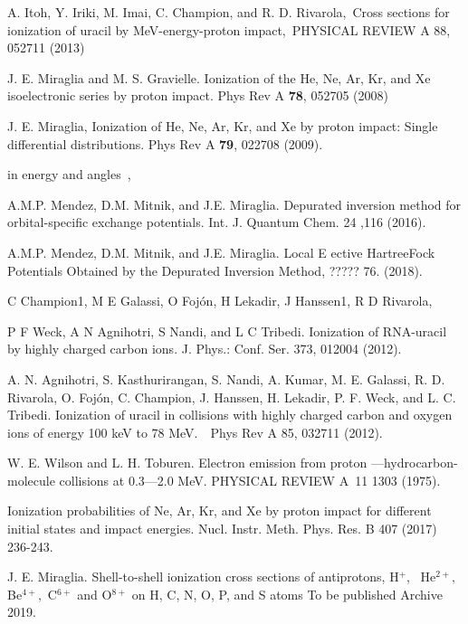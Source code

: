 \documentclass[preprint,showpacs,pra]{revtex4}
\begin{document}
\begin{thebibliography}{99}
 A. Itoh, Y. Iriki, M. Imai, C. Champion, and R. D.
Rivarola,~Cross sections for ionization of uracil by MeV-energy-proton
impact,\ PHYSICAL REVIEW A 88, 052711 (2013)

 J. E. Miraglia and M. S. Gravielle. Ionization of the
He, Ne, Ar, Kr, and Xe isoelectronic series by proton impact. Phys Rev A 
\textbf{78}, 052705 (2008)

 J. E. Miraglia, Ionization of He, Ne, Ar, Kr, and Xe
by proton impact: Single differential distributions. Phys Rev A \textbf{79},
022708 (2009).

\bibitem{} in energy and angles~,

 A.M.P. Mendez, D.M. Mitnik, and J.E. Miraglia.
Depurated inversion method for orbital-specific exchange potentials. Int. J.
Quantum Chem. 24 ,116 (2016).

 A.M.P. Mendez, D.M. Mitnik, and J.E. Miraglia. Local E
ective HartreeFock Potentials Obtained by the Depurated Inversion Method,
????? 76. (2018).

 C Champion1, M E Galassi, O Foj\'{o}n, H Lekadir, J
Hanssen1, R D Rivarola,

P F Weck, A N Agnihotri, S Nandi, and L C Tribedi. Ionization of RNA-uracil
by highly charged carbon ions. J. Phys.: Conf. Ser. 373, 012004 (2012).

 A. N. Agnihotri, S. Kasthurirangan, S. Nandi, A.
Kumar, M. E. Galassi, R. D. Rivarola, O. Foj\'{o}n, C. Champion, J. Hanssen,
H. Lekadir, P. F. Weck, and L. C. Tribedi. Ionization of uracil in
collisions with highly charged carbon and oxygen ions of energy 100 keV to
78 MeV.\ \ Phys Rev A 85, 032711 (2012).

 W. E. Wilson and L. H. Toburen. Electron emission from
proton ---hydrocarbon-molecule collisions at 0.3---2.0 MeV. PHYSICAL REVIEW
A\ 11 1303 (1975).

 Ionization probabilities of Ne, Ar, Kr, and Xe by
proton impact for different initial states and impact energies. Nucl. Instr.
Meth. Phys. Res. B 407 (2017) 236-243.

 J. E. Miraglia. Shell-to-shell ionization cross
sections of antiprotons, H$^{+}$, \ He$^{2+},$ Be$^{4+},$ C$^{6+}$ and O$%
^{8+}$ on H, C, N, O, P, and S atoms To be published Archive 2019.


\end{thebibliography}
\end{document}

